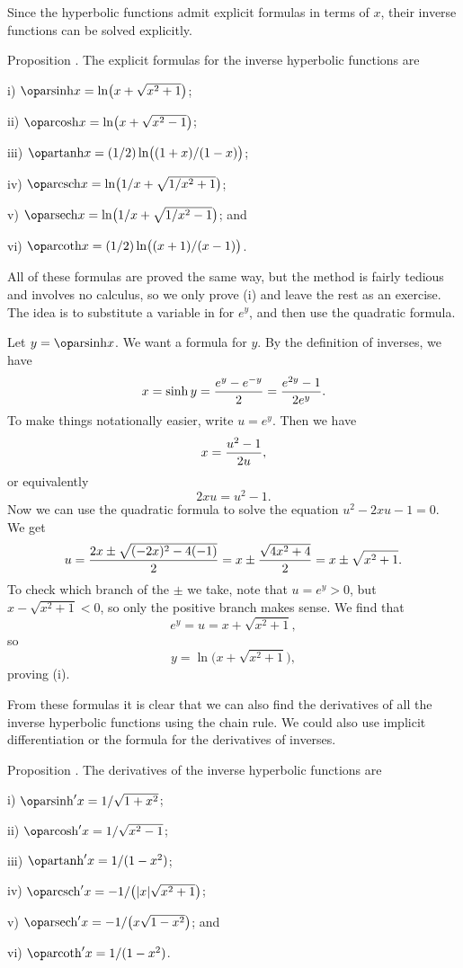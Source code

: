 Since the hyperbolic functions admit explicit formulas in terms of $x$, their inverse functions can be
solved explicitly.

\proclaim Proposition \advthm. The explicit formulas for the inverse hyperbolic functions are
\medskip
\item{i)} $\arsinh x = \ln\bigl( x + \sqrt{x^2+1}\bigr)$;
\smallskip
\item{ii)} $\arcosh x = \ln\bigl( x + \sqrt{x^2-1}\bigr)$;
\smallskip
\item{iii)} $\artanh x = (1/2) \ln\bigl( (1+x)/(1-x)\bigr)$;
\smallskip
\item{iv)} $\arcsch x = \ln\bigl( 1/x + \sqrt{1/x^2 + 1}\bigr)$;
\smallskip
\item{v)} $\arsech x = \ln\bigl( 1/x + \sqrt{1/x^2 - 1}\bigr)$; and
\smallskip
\item{vi)} $\arcoth x = (1/2) \ln\bigl( (x+1) / (x-1)\bigr)$.
\medskip

\proof All of these formulas are proved the same way, but the method is fairly tedious and involves
no calculus, so we only prove
(i) and leave the rest as an exercise. The idea is to substitute a variable in for $e^y$, and then use the
quadratic formula.

Let $y = \arsinh x$. We want a formula for $y$. By the definition of inverses, we have
$$x = \sinh y = {e^y - e^{-y}\over 2} = {e^{2y} - 1\over 2e^y}.$$
To make things notationally easier, write $u=e^y$. Then we have
$$ x = {u^2 - 1\over 2u},$$
or equivalently
$$ 2x u = u^2 - 1.$$
Now we can use the quadratic formula to solve the equation $u^2 - 2x u - 1 = 0$. We get
$$u = {2x \pm \sqrt{ (-2x)^2 - 4(-1) }\over 2} = x \pm {\sqrt{4x^2 + 4}\over 2}
= x \pm \sqrt{x^2 + 1}.$$
To check which branch of the $\pm$ we take, note that $u = e^y > 0$, but $x-\sqrt{x^2 + 1} < 0$, so only
the positive branch makes sense. We find that
$$e^y = u = x + \sqrt{x^2 + 1},$$
so
$$y = \ln\bigl( x+ \sqrt{x^2+1}\bigr),$$
proving (i).\slug

From these formulas it is clear that we can also find the derivatives of all the inverse hyperbolic functions
using the chain rule. We could also use implicit differentiation or the formula for the derivatives of inverses.

\proclaim Proposition \advthm. The derivatives of the inverse hyperbolic functions are
\medskip
\item{i)} $\arsinh' x = 1/\sqrt{1+x^2}$;
\smallskip
\item{ii)} $\arcosh' x = 1/\sqrt{x^2-1}$;
\smallskip
\item{iii)} $\artanh' x = 1/(1-x^2)$;
\smallskip
\item{iv)} $\arcsch' x = -1/ \bigl( |x| \sqrt{x^2+1}\bigr)$;
\smallskip
\item{v)} $\arsech' x = -1/\bigl( x\sqrt{1-x^2}\bigr)$; and
\smallskip
\item{vi)} $\arcoth' x = 1/(1-x^2)$.
\medskip

